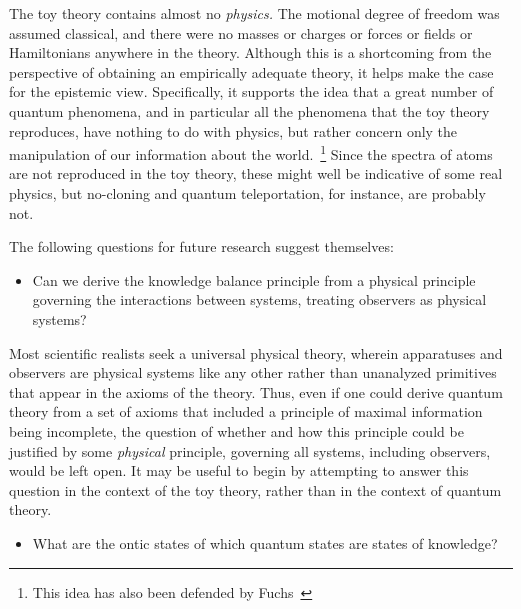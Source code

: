 \documentclass[pra,twocolumn,nofootinbib,showpacs]{revtex4}
\begin{document}
The toy theory contains almost no \emph{physics. }The motional
degree of freedom was assumed classical, and there were no masses
or charges or forces or fields or Hamiltonians anywhere in the
theory. Although this is a shortcoming from the perspective of
obtaining an empirically adequate theory, it helps make the case
for the epistemic view. Specifically, it supports the idea that a
great number of quantum phenomena, and in particular all the
phenomena that the toy theory reproduces, have nothing to do with
physics, but rather concern only the manipulation of our
information about the world.~\footnote{This idea has also been
defended by Fuchs~\cite{Fuchssamizdat}} Since the spectra of atoms
are not reproduced in the toy theory, these might well be
indicative of some real physics, but no-cloning and quantum
teleportation, for instance, are probably not.

The following questions for future research suggest themselves:

\begin{itemize}
\item Can we derive the knowledge balance principle from a physical
principle governing the interactions between systems, treating observers as
physical systems?
\end{itemize}

Most scientific realists seek a universal physical theory, wherein
apparatuses and observers are physical systems like any other rather than
unanalyzed primitives that appear in the axioms of the theory. Thus, even if
one could derive quantum theory from a set of axioms that included a
principle of maximal information being incomplete, the question of whether
and how this principle could be justified by some \emph{physical} principle,
governing all systems, including observers, would be left open. It may be
useful to begin by attempting to answer this question in the context of the
toy theory, rather than in the context of quantum theory.

\begin{itemize}
\item What are the ontic states of which quantum states are states of
knowledge?
\end{itemize}
\end{document}
